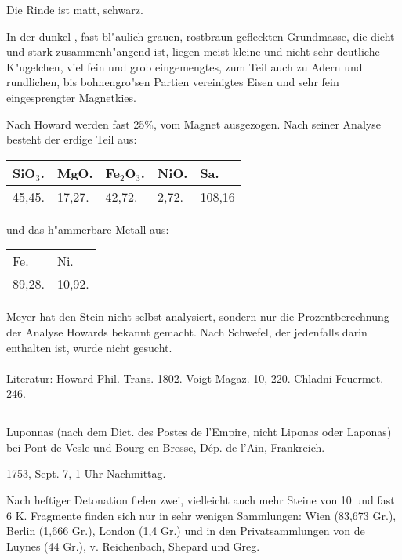 \documentclass[a4paper, 11pt, oneside]{article}
\begin{document}
Die Rinde ist matt, schwarz.

In der dunkel-, fast bl"aulich-grauen, rostbraun gefleckten Grundmasse, die dicht und stark zusammenh"angend ist, liegen meist kleine und nicht sehr deutliche K"ugelchen, viel fein und grob eingemengtes, zum Teil auch zu Adern und rundlichen, bis bohnengro"sen Partien vereinigtes Eisen und sehr fein eingesprengter Magnetkies.

Nach Howard werden fast 25\%, vom Magnet ausgezogen. Nach seiner Analyse besteht der erdige Teil aus:
\begin{table}[!ht]
    \centering\swabfamily\Large
    \begin{tabular}{l l l l l}
        SiO$_{3}$. & MgO. & Fe$_{2}$O$_{3}$. & NiO. & Sa.\\\hline
        45,45. & 17,27. & 42,72. & 2,72. & 108,16
    \end{tabular}
\end{table}

und das h"ammerbare Metall aus:
\begin{table}[!ht]
    \centering\swabfamily\Large
    \begin{tabular}{l l}
        Fe. & Ni.\\
        89,28. & 10,92.
    \end{tabular}
\end{table}

Meyer hat den Stein nicht selbst analysiert, sondern nur die Prozentberechnung der Analyse Howards bekannt gemacht. Nach Schwefel, der jedenfalls darin enthalten ist, wurde nicht gesucht.
\normalsize
\paragraph{}
Literatur: Howard Phil. Trans. 1802. Voigt Magaz. 10, 220. Chladni Feuermet. 246.
\subsection{}
\LARGE
\paragraph{}
Luponnas (nach dem Dict. des Postes de l'Empire, nicht Liponas oder Laponas) bei Pont-de-Vesle und Bourg-en-Bresse, Dép. de l'Ain, Frankreich.

1753, Sept. 7, 1 Uhr Nachmittag.

Nach heftiger Detonation fielen zwei, vielleicht auch mehr Steine von 10 und fast 6 K. Fragmente finden sich nur in sehr wenigen Sammlungen: Wien (83,673 Gr.), Berlin (1,666 Gr.), London (1,4 Gr.) und in den Privatsammlungen von de Luynes (44 Gr.), v. Reichenbach, Shepard und Greg.
\end{document}
